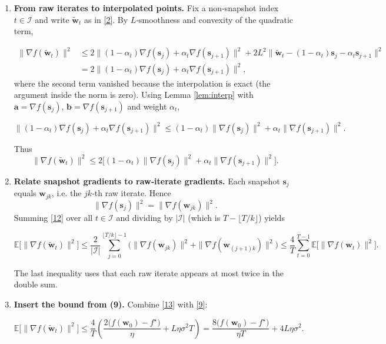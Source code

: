 \documentclass{article}
\begin{document}
\begin{enumerate}
\item[Step 6.] \textbf{From raw iterates to interpolated points.}  
Fix a non‑snapshot index $t\in\mathcal{I}$ and write $\tilde{\mathbf{w}}_t$ as in \eqref{2}. By $L$‑smoothness and convexity of the quadratic term,

\[
\begin{aligned}
\|\nabla f(\tilde{\mathbf{w}}_t)\|^2
&\le 2\Big\|(1-\alpha_t)\nabla f(\mathbf{s}_{j})+\alpha_t\nabla f(\mathbf{s}_{j+1})\Big\|^2
      +2L^2\|\tilde{\mathbf{w}}_t-(1-\alpha_t)\mathbf{s}_{j}-\alpha_t\mathbf{s}_{j+1}\|^2\\
&=2\Big\|(1-\alpha_t)\nabla f(\mathbf{s}_{j})+\alpha_t\nabla f(\mathbf{s}_{j+1})\Big\|^2,
\end{aligned}
\tag{10}
\]
where the second term vanished because the interpolation is exact (the argument inside the norm is zero). Using Lemma \ref{lem:interp} with $\mathbf{a}=\nabla f(\mathbf{s}_{j})$, $\mathbf{b}=\nabla f(\mathbf{s}_{j+1})$ and weight $\alpha_t$,

\[
\Big\|(1-\alpha_t)\nabla f(\mathbf{s}_{j})+\alpha_t\nabla f(\mathbf{s}_{j+1})\Big\|^2
\le (1-\alpha_t)\|\nabla f(\mathbf{s}_{j})\|^2+\alpha_t\|\nabla f(\mathbf{s}_{j+1})\|^2 . \tag{11}
\]

Thus
\[
\|\nabla f(\tilde{\mathbf{w}}_t)\|^2\le
2\big[(1-\alpha_t)\|\nabla f(\mathbf{s}_{j})\|^2+\alpha_t\|\nabla f(\mathbf{s}_{j+1})\|^2\big]. \tag{12}
\]

\item[Step 7.] \textbf{Relate snapshot gradients to raw‑iterate gradients.}  
Each snapshot $\mathbf{s}_j$ equals $\mathbf{w}_{jk}$, i.e. the $jk$‑th raw iterate. Hence
\[
\|\nabla f(\mathbf{s}_{j})\|^2 = \|\nabla f(\mathbf{w}_{jk})\|^2 .
\]
Summing \eqref{12} over all $t\in\mathcal{I}$ and dividing by $|\mathcal{I}|$ (which is $T-\lfloor T/k\rfloor$) yields

\[
\mathbb{E}\big[\|\nabla f(\tilde{\mathbf{w}}_t)\|^2\big]
\le
\frac{2}{|\mathcal{I}|}\sum_{j=0}^{\lfloor T/k\rfloor-1}
\Big(\|\nabla f(\mathbf{w}_{jk})\|^2+\|\nabla f(\mathbf{w}_{(j+1)k})\|^2\Big)
\le \frac{4}{T}\sum_{t=0}^{T-1}\mathbb{E}\big[\|\nabla f(\mathbf{w}_t)\|^2\big]. \tag{13}
\]

The last inequality uses that each raw iterate appears at most twice in the double sum.

\item[Step 8.] \textbf{Insert the bound from (9).}  
Combine \eqref{13} with \eqref{9}:

\[
\mathbb{E}\big[\|\nabla f(\tilde{\mathbf{w}}_t)\|^2\big]
\le
\frac{4}{T}\left(
\frac{2\big(f(\mathbf{w}_0)-f^\star\big)}{\eta}
+L\eta\sigma^2 T\right)
=
\frac{8\big(f(\mathbf{w}_0)-f^\star\big)}{\eta T}
+4L\eta\sigma^2. \tag{14}
\]


\end{enumerate}
\end{document}
